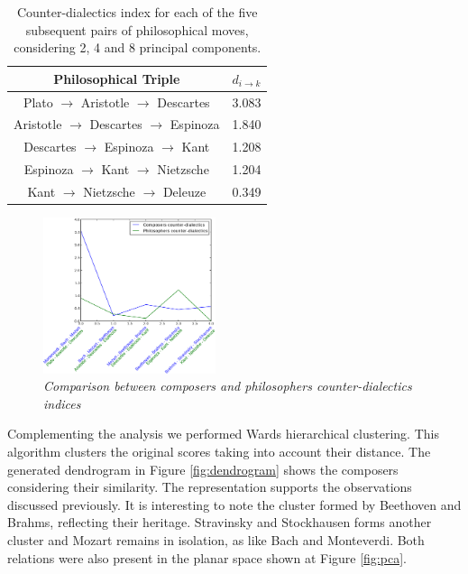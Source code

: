 \documentclass[
 aip,
 jmp,
 amsmath,amssymb,
 reprint,
]{revtex4-1}
\begin{document}
\begin{table}%
\caption{\label{tab:tablephiE} Counter-dialectics index for each
of the five subsequent pairs of philosophical moves, considering 2, 4 and 8 principal components.}

\begin{tabular}{|c||c|}
\hline
Philosophical Triple & $d_{i \rightarrow k}$ \\
\hline \hline
Plato $\rightarrow$ Aristotle $\rightarrow$ Descartes    & 3.083 \\
Aristotle $\rightarrow$ Descartes $\rightarrow$ Espinoza & 1.840 \\
Descartes $\rightarrow$ Espinoza $\rightarrow$ Kant      & 1.208 \\
Espinoza $\rightarrow$ Kant $\rightarrow$ Nietzsche      & 1.204 \\
Kant $\rightarrow$ Nietzsche $\rightarrow$ Deleuze       & 0.349 \\
\hline
\end{tabular}
\end{table}

\begin{figure}[ht]
        \begin{center}
                \includegraphics[width=0.45\textwidth]{compara_dialeticas2}
        \end{center}
        \caption{\it Comparison between composers and philosophers
          counter-dialectics indices}
        \label{fig:comparingdialectics}
\end{figure}

Complementing the analysis we performed Wards hierarchical
clustering. This algorithm clusters the original scores taking into
account their distance. The generated dendrogram in
Figure \ref{fig:dendrogram} shows the composers
considering their similarity. The representation supports the
observations discussed previously. It is interesting to note the cluster
formed by Beethoven and Brahms, reflecting their heritage. Stravinsky
and Stockhausen forms another cluster and Mozart remains in isolation,
as like Bach and Monteverdi. Both relations were also present in the
planar space shown at Figure \ref{fig:pca}.
\end{document}
